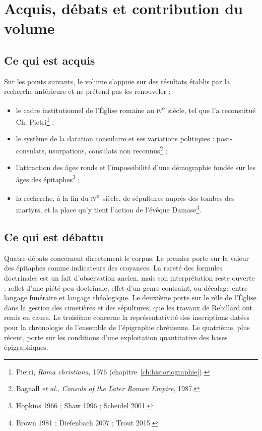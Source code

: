 \chapter{Acquis, débats et contribution du volume}\label{ch:contribution}

\section{Ce qui est acquis}

Sur les points suivants, le volume s’appuie sur des résultats établis par la recherche antérieure et ne prétend pas les renouveler :
\begin{itemize}
\item le cadre institutionnel de l’Église romaine au \textsc{iv}\textsuperscript{e}~siècle, tel que l’a reconstitué Ch. Pietri\footnote{Pietri, \emph{Roma christiana}, 1976 (chapitre~\ref{ch:historiographie}).} ;
\item le système de la datation consulaire et ses variations politiques : post-consulats, usurpations, consulats non reconnus\footnote{Bagnall \emph{et al.}, \emph{Consuls of the Later Roman Empire}, 1987.} ;
\item l’attraction des âges ronds et l’impossibilité d’une démographie fondée sur les âges des épitaphes\footnote{Hopkins 1966 ; Shaw 1996 ; Scheidel 2001.} ;
\item la recherche, à la fin du \textsc{iv}\textsuperscript{e}~siècle, de sépultures auprès des tombes des martyrs, et la place qu’y tient l’action de l’évêque Damase\footnote{Brown 1981 ; Diefenbach 2007 ; Trout 2015.}.
\end{itemize}

\section{Ce qui est débattu}

Quatre débats concernent directement le corpus. Le premier porte sur la valeur des épitaphes comme indicateurs des croyances. La rareté des formules doctrinales est un fait d’observation ancien, mais son interprétation reste ouverte : reflet d’une piété peu doctrinale, effet d’un genre contraint, ou décalage entre langage funéraire et langage théologique. Le deuxième porte sur le rôle de l’Église dans la gestion des cimetières et des sépultures, que les travaux de Rebillard ont remis en cause. Le troisième concerne la représentativité des inscriptions datées pour la chronologie de l’ensemble de l’épigraphie chrétienne. Le quatrième, plus récent, porte sur les conditions d’une exploitation quantitative des bases épigraphiques.

